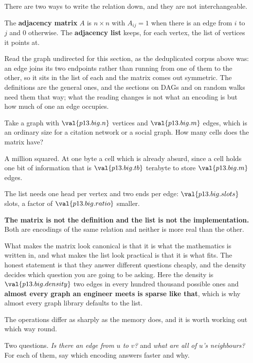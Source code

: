 \begin{fr}
There are two ways to write the relation down, and they are not
interchangeable.

The \textbf{adjacency matrix} $A$ is $n \times n$ with $A_{ij} = 1$ when there
is an edge from $i$ to $j$ and $0$ otherwise. The \textbf{adjacency list}
keeps, for each vertex, the list of vertices it points at.

Read the graph undirected for this section, as the deduplicated corpus above
was: an edge joins its two endpoints rather than running from one of them to
the other, so it sits in the list of each and the matrix comes out symmetric.
The definitions are the general ones, and the sections on DAGs and on random
walks need them that way; what the reading changes is not what an encoding is
but how much of one an edge occupies.

Take a graph with $\val{p13.big.n}$ vertices and $\val{p13.big.m}$ edges,
which is an ordinary size for a citation network or a social graph. How many
cells does the matrix have?
\dotline
\nextframe
\end{fr}

\begin{fr}
A million squared. At one byte a cell \dash{} which is already absurd, since a
cell holds one bit of information \dash{} that is
$\val{p13.big.tb}$ terabyte to store $\val{p13.big.m}$ edges.

The list needs one head per vertex and two ends per edge:
$\val{p13.big.slots}$ slots, a factor of $\val{p13.big.ratio}$ smaller.

\begin{trapbox}
\textbf{The matrix is not the definition and the list is not the
implementation.} Both are encodings of the same relation and neither is more
real than the other.

What makes the matrix look canonical is that it is what the mathematics is
written in, and what makes the list look practical is that it is what fits.
The honest statement is that they answer different questions cheaply, and the
density decides which question you are going to be asking. Here the density is
$\val{p13.big.density}$ \dash{} two edges in every hundred thousand possible
ones \dash{} and \textbf{almost every graph an engineer meets is sparse like
that}, which is why almost every graph library defaults to the list.
\end{trapbox}
\end{fr}

\begin{fr}
The operations differ as sharply as the memory does, and it is worth working
out which way round.

Two questions. \emph{Is there an edge from $u$ to $v$?} and \emph{what are all
of $u$'s neighbours?} For each of them, say which encoding answers faster and
why.
\dotline
\nextframe
\end{fr}

